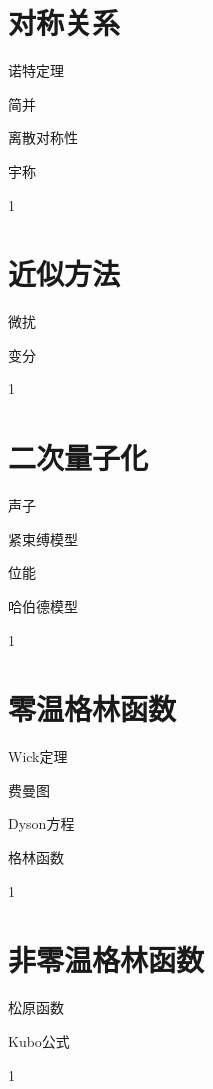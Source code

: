 \documentclass[lang=cn,newtx,10pt,scheme=chinese,thmcnt=section]{elegantbook}
\begin{document}
\chapter{对称关系}
\begin{introduction}
	\item 诺特定理
	\item 简并
	\item 离散对称性
	\item 宇称
\end{introduction}
1

\chapter{近似方法}
\begin{introduction}
	\item 微扰
	\item 变分
\end{introduction}
1

\chapter{二次量子化}
\begin{introduction}
	\item 声子
	\item 紧束缚模型
	\item 位能
	\item 哈伯德模型
\end{introduction}
1

\chapter{零温格林函数}
\begin{introduction}
	\item Wick定理
	\item 费曼图
	\item Dyson方程
	\item 格林函数
\end{introduction}
1

\chapter{非零温格林函数}
\begin{introduction}
	\item 松原函数
	\item Kubo公式
\end{introduction}
1
\end{document}
